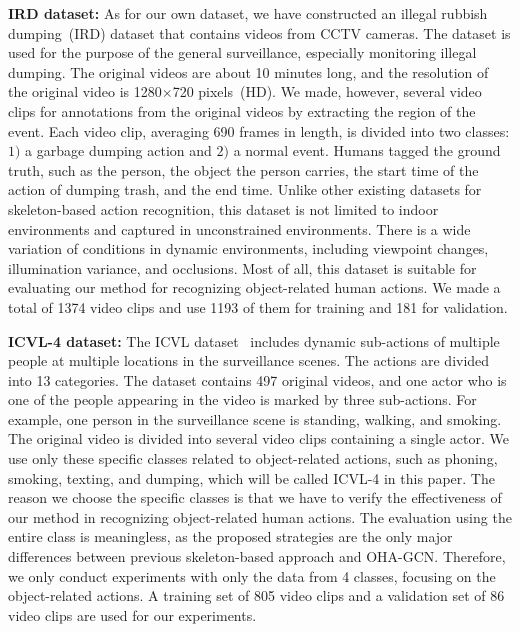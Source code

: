 \documentclass[10pt,twocolumn,letterpaper]{article}
\begin{document}
\textbf{IRD dataset:} 
As for our own dataset, we have constructed an illegal rubbish dumping~(IRD) dataset that contains videos from CCTV cameras.
The dataset is used for the purpose of the general surveillance, especially monitoring illegal dumping.
The original videos are about 10 minutes long, and the resolution of the original video is 1280$\times$720 pixels~(HD).
We made, however, several video clips for annotations from the original videos by extracting the region of the event.
Each video clip, averaging 690 frames in length, is divided into two classes: $1)$ a garbage dumping action and $2)$ a normal event.
Humans tagged the ground truth, such as the person, the object the person carries, the start time of the action of dumping trash, and the end time.
Unlike other existing datasets for skeleton-based action recognition, this dataset is not limited to indoor environments and captured in unconstrained environments.
There is a wide variation of conditions in dynamic environments, including viewpoint changes, illumination variance, and occlusions.
Most of all, this dataset is suitable for evaluating our method for recognizing object-related human actions.
We made a total of 1374 video clips and use 1193 of them for training and 181 for validation.

\textbf{ICVL-4 dataset:} 
The ICVL dataset~\cite{Jin:2018hda} includes dynamic sub-actions of multiple people at multiple locations in the surveillance scenes.
The actions are divided into 13 categories. 
The dataset contains 497 original videos, and one actor who is one of the people appearing in the video is marked by three sub-actions. 
For example, one person in the surveillance scene is standing, walking, and smoking.
The original video is divided into several video clips containing a single actor.
We use only these specific classes related to object-related actions, such as phoning, smoking, texting, and dumping, which will be called ICVL-4 in this paper.
The reason we choose the specific classes is that we have to verify the effectiveness of our method in recognizing object-related human actions. 
The evaluation using the entire class is meaningless, as the proposed strategies are the only major differences between previous skeleton-based approach and OHA-GCN.
Therefore, we only conduct experiments with only the data from 4 classes, focusing on the object-related actions.
A training set of 805 video clips and a validation set of 86 video clips are used for our experiments.
\end{document}
